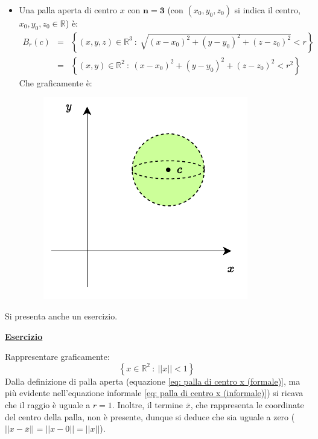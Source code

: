 \documentclass[a4paper]{article}
\newcommand{\example}[1]{\textcolor{Green4}{\textbf{#1}}}
\begin{document}
\begin{itemize}
		\item Una palla aperta di centro $x$ con $\boldsymbol{n=3}$ (con $\left(x_{0}, y_{0}, z_{0}\right)$ si indica il centro, $x_{0}, y_{0}, z_{0} \in \mathbb{R}$) è:
		\begin{equation*}
			\begin{array}{rcl}
				B_{r}\left(c\right) &=& \left\{\left(x,y,z\right) \in \mathbb{R}^{3} \: : \: \sqrt{\left(x-x_{0}\right)^{2} + \left(y-y_{0}\right)^{2} + \left(z-z_{0}\right)^{2}} < r \right\} \\ [1em]
				&=& \left\{\left(x,y\right)\in\mathbb{R}^{2} \: : \: \left(x-x_{0}\right)^{2} + \left(y-y_{0}\right)^{2} + \left(z-z_{0}\right)^{2} < r^{2}\right\}
			\end{array}
		\end{equation*}
		Che graficamente è:
		\begin{figure}[!htp]
			\centering
			\includegraphics[width=.45\textwidth]{img/palla_aperta_n=3.pdf}
		\end{figure}
	\end{itemize}
	Si presenta anche un esercizio. 
	
	\begin{flushleft}
		\example{\underline{Esercizio}}
	\end{flushleft}

	\noindent
	Rappresentare graficamente:
	\begin{equation*}
		\left\{x \in \mathbb{R}^{2} \: : \: ||x|| < 1\right\}
	\end{equation*}
	Dalla definizione di palla aperta (equazione \ref{eq: palla di centro x (formale)}, ma più evidente nell'equazione informale \ref{eq: palla di centro x (informale)}) si ricava che il raggio è uguale a $r = 1$. Inoltre, il termine $\overline{x}$, che rappresenta le coordinate del centro della palla, non è presente, dunque si deduce che sia uguale a zero ($||x - \overline{x}|| = ||x - 0|| = || x ||$).
\end{document}
